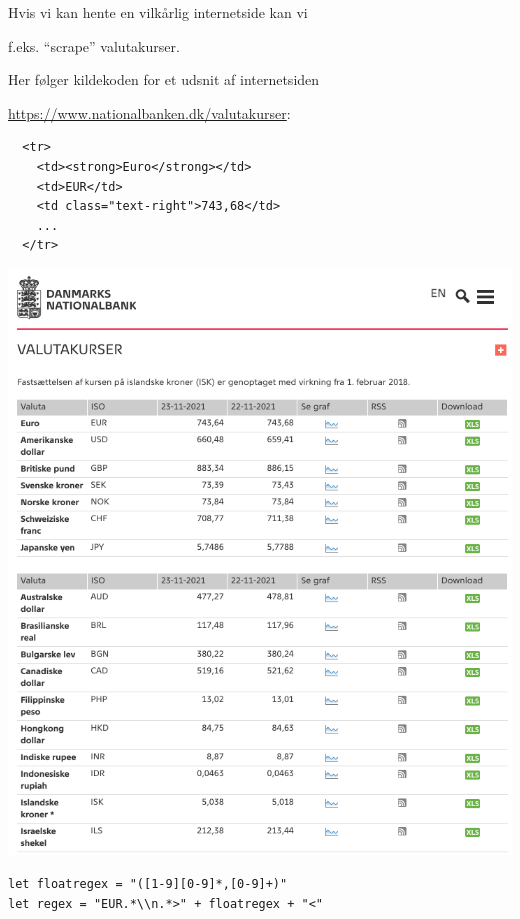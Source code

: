 \documentclass[rgb]{beamer}
\begin{document}
\begin{frame}[fragile]
\begin{footnotesize}

\begin{minipage}{.65\textwidth}
  Hvis vi kan hente en vilkårlig internetside kan vi

  f.eks. ``scrape'' valutakurser.

  \vspace{2mm}

  Her følger kildekoden for et udsnit af internetsiden

  \begin{scriptsize}\url{https://www.nationalbanken.dk/valutakurser}:
  \end{scriptsize}
\begin{verbatim}
  <tr>
    <td><strong>Euro</strong></td>
    <td>EUR</td>
    <td class="text-right">743,68</td>
    ...
  </tr>
\end{verbatim}
\end{minipage}
\begin{minipage}{.3\textwidth}
  \includegraphics[width=1.2\textwidth]{valutakurser.png}
\end{minipage}


\begin{lstlisting}[numbers=none,frame=none]
let floatregex = "([1-9][0-9]*,[0-9]+)"
let regex = "EUR.*\\n.*>" + floatregex + "<"
\end{lstlisting}

\end{footnotesize}
\end{frame}
\end{document}
